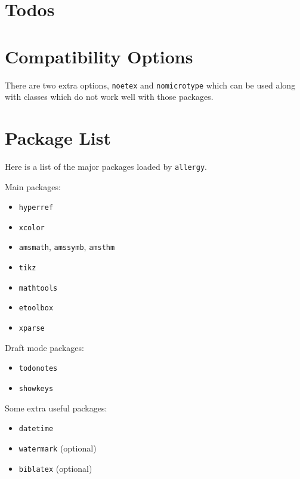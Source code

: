 \documentclass{scrartcl}
\begin{document}
\section{Todos}



\section{Compatibility Options}

There are two extra options, \verb|noetex| and \verb|nomicrotype| which can be used along with classes which do not work well with those packages.

\section{Package List}

Here is a list of the major packages loaded by \texttt{allergy}.

Main packages:
\begin{itemize}
\item \texttt{hyperref}
\item \texttt{xcolor}
\item \texttt{amsmath}, \texttt{amssymb}, \texttt{amsthm}
\item \texttt{tikz}
\item \texttt{mathtools}
\item \texttt{etoolbox}
\item \texttt{xparse}
\end{itemize}

Draft mode packages:
\begin{itemize}
\item \texttt{todonotes}
\item \texttt{showkeys}
\end{itemize}

Some extra useful packages:
\begin{itemize}
\item \texttt{datetime}
\item \texttt{watermark} (optional)
\item \texttt{biblatex} (optional)
\end{itemize}
\end{document}
